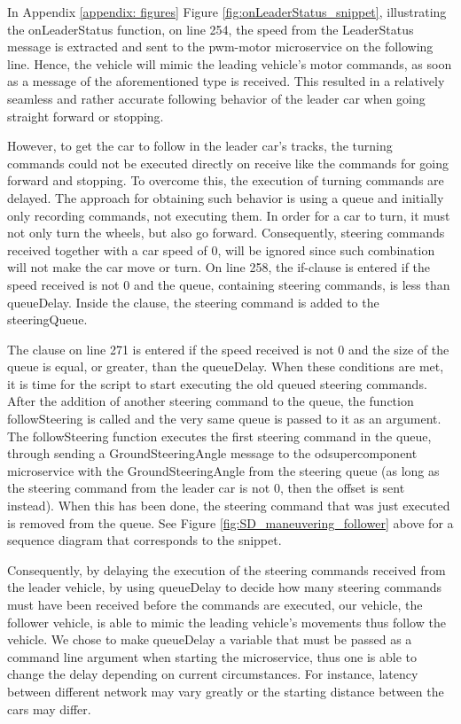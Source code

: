 \documentclass[12pt]{article}
\begin{document}
In Appendix \ref{appendix: figures} Figure \ref{fig:onLeaderStatus_snippet}, illustrating the onLeaderStatus function, on line 254, the speed from the LeaderStatus message is extracted and sent to the pwm-motor microservice on the following line. Hence, the vehicle will mimic the leading vehicle's motor commands, as soon as a  message of the aforementioned type is received. This resulted in a relatively seamless and rather accurate following behavior of the leader car when going  straight forward or stopping. 
\par
However, to get the car to follow in the leader car's tracks, the turning commands could not be executed directly on receive like the commands for going forward and stopping. To overcome this, the execution of turning commands are delayed. The approach for obtaining such behavior is using a queue and initially only recording commands, not executing them. In order for a car to turn, it must not only turn the wheels, but also go forward. Consequently, steering commands received together with a car speed of 0, will be ignored since such combination will not make the car move or turn. On line 258, the if-clause is entered if the speed received is not 0 and the queue, containing steering commands, is less than queueDelay. Inside the clause, the steering command is added to the steeringQueue. 

The clause on line 271 is entered if the speed received is not 0 and the size of the queue is equal, or greater, than the queueDelay. When these conditions are met, it is time for the script to start executing the old queued steering commands. After the addition of another steering command to the queue, the function followSteering is called and the very same queue is passed to it as an argument. The followSteering function executes the first steering command in the queue, through sending a GroundSteeringAngle message to the odsupercomponent microservice with the GroundSteeringAngle from the steering queue (as long as the steering command from the leader car is not 0, then the offset is sent instead). When this has been done, the steering command that was just executed is removed from the queue. See Figure \ref{fig:SD_maneuvering_follower} above for a sequence diagram that corresponds to the snippet.
\par
Consequently, by delaying the execution of the steering commands received from the leader vehicle, by using queueDelay to decide how many steering commands must have been received before the commands are executed, our vehicle, the follower vehicle, is able to mimic the leading vehicle's movements thus follow the vehicle. We chose to make queueDelay a variable that must be passed as a command line argument when starting the microservice, thus one is able to change the delay depending on current circumstances. For instance, latency between different network may vary greatly or the starting distance between the cars may differ. 
\par
\end{document}
